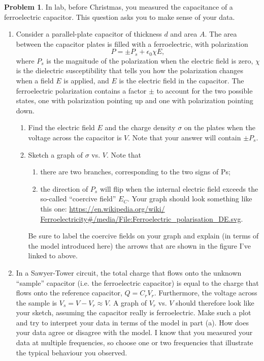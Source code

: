 \documentclass[10pt]{article}
\theoremstyle{definition}
\newtheorem{problem}{Problem}
\begin{document}
\begin{problem}
In lab, before Christmas, you measured the capacitance of a ferroelectric capacitor. This question asks you to
make sense of your data.
\begin{enumerate}[label=(\alph*)]
  \item Consider a parallel-plate capacitor of thickness $d$ and area $A$. The area between the capacitor plates is
        filled with a ferroelectric, with polarization
        $$P=\pm P_s +\epsilon_0\chi E,$$
        where $P_s$ is the magnitude of the polarization when the electric field is zero, $\chi$ is the dielectric susceptibility
        that tells you how the polarization changes when a field $E$ is applied, and $E$ is the electric field in the
        capacitor. The ferroelectric polarization contains a factor $\pm$ to account for the two possible states, one
        with polarization pointing up and one with polarization pointing down.
        \begin{enumerate}[label=\roman*]
          \item Find the electric field $E$ and the charge density $\sigma$ on the plates when the voltage across the capacitor
                is $V$. Note that your answer will contain $\pm P_s$.
          \item Sketch a graph of $\sigma$ vs. $V$. Note that
                \begin{enumerate}[label=\textbullet]
                  \item there are two branches, corresponding to the two signs of Ps;
                  \item the direction of $P_s$ will flip when the internal electric field exceeds the so-called “coercive
                        field” $E_C$. Your graph should look something like this one: \href{https://en.wikipedia.org/wiki/
                          Ferroelectricity#/media/File:Ferroelectric_polarisation_DE.svg}{https://en.wikipedia.org/wiki/
                          Ferroelectricity\#/media/File:Ferroelectric\_polarisation\_DE.svg}.
                \end{enumerate}
                Be sure to label the coercive fields on your graph and explain (in terms of the model introduced here)
                the arrows that are shown in the figure I've linked to above.
        \end{enumerate}
  \item In a Sawyer-Tower circuit, the total charge that flows onto the unknown “sample” capacitor (i.e. the ferroelectric capacitor)
        is equal to the charge that flows onto the reference capacitor, $Q = C_r V_r$. Furthermore,
        the voltage across the sample is $V_s = V - V_r \approx V$. A graph of $V_r$ vs. $V$ should therefore look like your
        sketch, assuming the capacitor really is ferroelectric. Make such a plot and try to interpret your data in
        terms of the model in part (a). How does your data agree or disagree with the model. I know that you
        measured your data at multiple frequencies, so choose one or two frequencies that illustrate the typical
        behaviour you observed.
\end{enumerate}
\end{problem}
\end{document}
